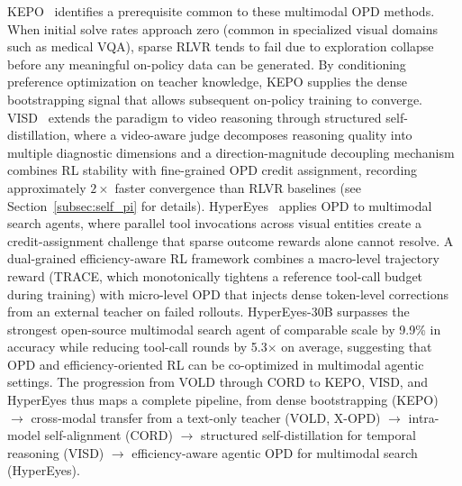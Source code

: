 \documentclass{article} %
\begin{document}
KEPO~\citep{2602.00400} identifies a prerequisite common to these multimodal OPD methods. When initial solve rates approach zero (common in specialized visual domains such as medical VQA), sparse RLVR tends to fail due to exploration collapse before any meaningful on-policy data can be generated. By conditioning preference optimization on teacher knowledge, KEPO supplies the dense bootstrapping signal that allows subsequent on-policy training to converge. VISD~\citep{2605.06094} extends the paradigm to video reasoning through structured self-distillation, where a video-aware judge decomposes reasoning quality into multiple diagnostic dimensions and a direction-magnitude decoupling mechanism combines RL stability with fine-grained OPD credit assignment, recording approximately $2\times$ faster convergence than RLVR baselines (see Section~\ref{subsec:self_pi} for details). HyperEyes~\citep{2605.07177} applies OPD to multimodal search agents, where parallel tool invocations across visual entities create a credit-assignment challenge that sparse outcome rewards alone cannot resolve. A dual-grained efficiency-aware RL framework combines a macro-level trajectory reward (TRACE, which monotonically tightens a reference tool-call budget during training) with micro-level OPD that injects dense token-level corrections from an external teacher on failed rollouts. HyperEyes-30B surpasses the strongest open-source multimodal search agent of comparable scale by 9.9\% in accuracy while reducing tool-call rounds by 5.3$\times$ on average, suggesting that OPD and efficiency-oriented RL can be co-optimized in multimodal agentic settings. The progression from VOLD through CORD to KEPO, VISD, and HyperEyes thus maps a complete pipeline, from dense bootstrapping (KEPO) $\to$ cross-modal transfer from a text-only teacher (VOLD, X-OPD) $\to$ intra-model self-alignment (CORD) $\to$ structured self-distillation for temporal reasoning (VISD) $\to$ efficiency-aware agentic OPD for multimodal search (HyperEyes).
\end{document}
